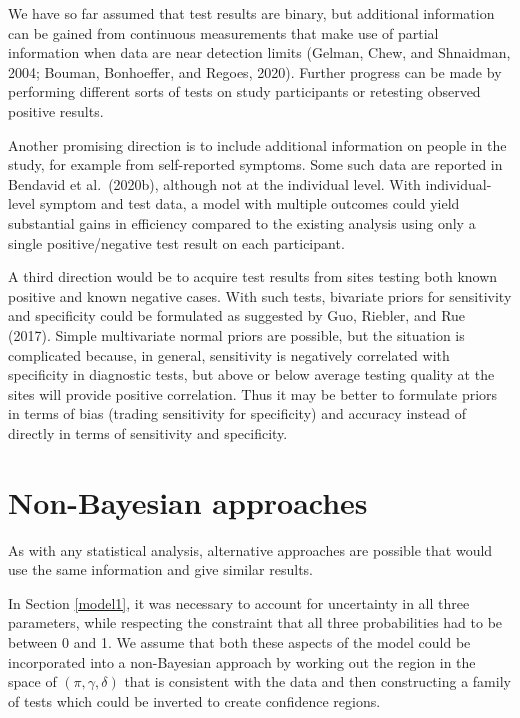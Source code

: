\documentclass[11pt]{article}
\begin{document}
We have so far assumed that test results are binary, but additional
information can be gained from continuous measurements that make use
of partial information when data are near detection limits (Gelman,
Chew, and Shnaidman, 2004; Bouman, Bonhoeffer, and Regoes, 2020).
Further progress can be made by performing different sorts of tests on
study participants or retesting observed positive results.

Another promising direction is to include additional information on
people in the study, for example from self-reported symptoms.  Some
such data are reported in Bendavid et al.\ (2020b), although not at
the individual level. With individual-level symptom and test data, a
model with multiple outcomes could yield substantial gains in
efficiency compared to the existing analysis using only a single
positive/negative test result on each participant.

A third direction would be to acquire test results from sites testing
both known positive and known negative cases.  With such tests,
bivariate priors for sensitivity and specificity could be formulated
as suggested by Guo, Riebler, and Rue (2017).  Simple multivariate
normal priors are possible, but the situation is complicated because,
in general, sensitivity is negatively correlated with specificity in
diagnostic tests, but above or below average testing quality at the
sites will provide positive correlation.  Thus it may be better to
formulate priors in terms of bias (trading sensitivity for
specificity) and accuracy instead of directly in terms of sensitivity
and specificity.


\section{Non-Bayesian approaches}\label{nonbayes}

As with any statistical analysis, alternative approaches are possible
that would use the same information and give similar results.

In Section \ref{model1}, it was necessary to account for uncertainty
in all three parameters, while respecting the constraint that all
three probabilities had to be between 0 and 1.  We assume that both
these aspects of the model could be incorporated into a non-Bayesian
approach by working out the region in the space of
$(\pi,\gamma,\delta)$ that is consistent with the data and then
constructing a family of tests which could be inverted to create
confidence regions.
\end{document}
